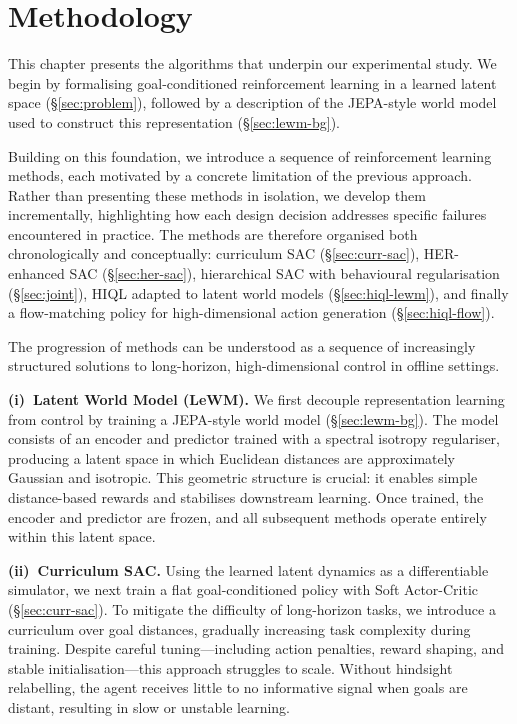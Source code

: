 
\chapter{Methodology}
\label{chap:methodology}

This chapter presents the algorithms that underpin our experimental study.
We begin by formalising goal-conditioned reinforcement learning in a learned
latent space (\S\ref{sec:problem}), followed by a description of the
JEPA-style world model used to construct this representation
(\S\ref{sec:lewm-bg}). 

Building on this foundation, we introduce a sequence of reinforcement
learning methods, each motivated by a concrete limitation of the previous
approach. Rather than presenting these methods in isolation, we develop them
incrementally, highlighting how each design decision addresses specific
failures encountered in practice. The methods are therefore organised both
chronologically and conceptually: curriculum SAC
(\S\ref{sec:curr-sac}), HER-enhanced SAC
(\S\ref{sec:her-sac}), hierarchical SAC with behavioural regularisation
(\S\ref{sec:joint}), HIQL adapted to latent world models
(\S\ref{sec:hiql-lewm}), and finally a flow-matching policy for
high-dimensional action generation (\S\ref{sec:hiql-flow}).

\medskip

The progression of methods can be understood as a sequence of increasingly
structured solutions to long-horizon, high-dimensional control in offline
settings.

\textbf{(i)~Latent World Model (LeWM).}
We first decouple representation learning from control by training a
JEPA-style world model (\S\ref{sec:lewm-bg}). The model consists of an
encoder and predictor trained with a spectral isotropy regulariser,
producing a latent space in which Euclidean distances are approximately
Gaussian and isotropic. This geometric structure is crucial: it enables
simple distance-based rewards and stabilises downstream learning.
Once trained, the encoder and predictor are frozen, and all subsequent
methods operate entirely within this latent space.

\textbf{(ii)~Curriculum SAC.}
Using the learned latent dynamics as a differentiable simulator, we next
train a flat goal-conditioned policy with Soft Actor-Critic
(\S\ref{sec:curr-sac}). To mitigate the difficulty of long-horizon tasks,
we introduce a curriculum over goal distances, gradually increasing task
complexity during training. Despite careful tuning—including action
penalties, reward shaping, and stable initialisation—this approach
struggles to scale. Without hindsight relabelling, the agent receives
little to no informative signal when goals are distant, resulting in slow
or unstable learning.

